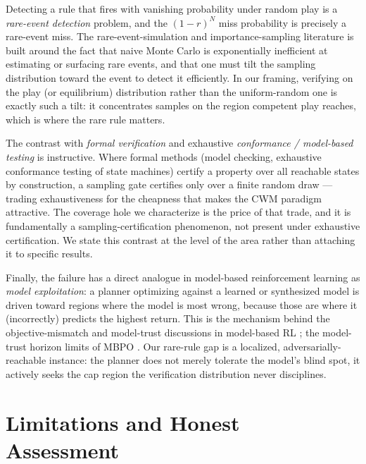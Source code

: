 \documentclass[11pt]{article}
\theoremstyle{remark}
\begin{document}
Detecting a rule that fires with vanishing probability under random play is a \emph{rare-event detection} problem, and the $(1-r)^N$ miss probability is precisely a rare-event miss. The rare-event-simulation and importance-sampling literature \citep[e.g.,][]{rubinstein2017montecarlo} is built around the fact that naive Monte Carlo is exponentially inefficient at estimating or surfacing rare events, and that one must tilt the sampling distribution toward the event to detect it efficiently. In our framing, verifying on the play (or equilibrium) distribution rather than the uniform-random one is exactly such a tilt: it concentrates samples on the region competent play reaches, which is where the rare rule matters.

The contrast with \emph{formal verification} and exhaustive \emph{conformance / model-based testing} is instructive. Where formal methods (model checking, exhaustive conformance testing of state machines) certify a property over all reachable states by construction, a sampling gate certifies only over a finite random draw --- trading exhaustiveness for the cheapness that makes the CWM paradigm attractive. The coverage hole we characterize is the price of that trade, and it is fundamentally a sampling-certification phenomenon, not present under exhaustive certification. We state this contrast at the level of the area rather than attaching it to specific results.

Finally, the failure has a direct analogue in model-based reinforcement learning as \emph{model exploitation}: a planner optimizing against a learned or synthesized model is driven toward regions where the model is most wrong, because those are where it (incorrectly) predicts the highest return. This is the mechanism behind the objective-mismatch and model-trust discussions in model-based RL \citep{lambert2020objective}; the model-trust horizon limits of MBPO \citep{janner2019mbpo}. Our rare-rule gap is a localized, adversarially-reachable instance: the planner does not merely tolerate the model's blind spot, it actively seeks the cap region the verification distribution never disciplines.

\section{Limitations and Honest Assessment}
\label{sec:limitations}
\end{document}
